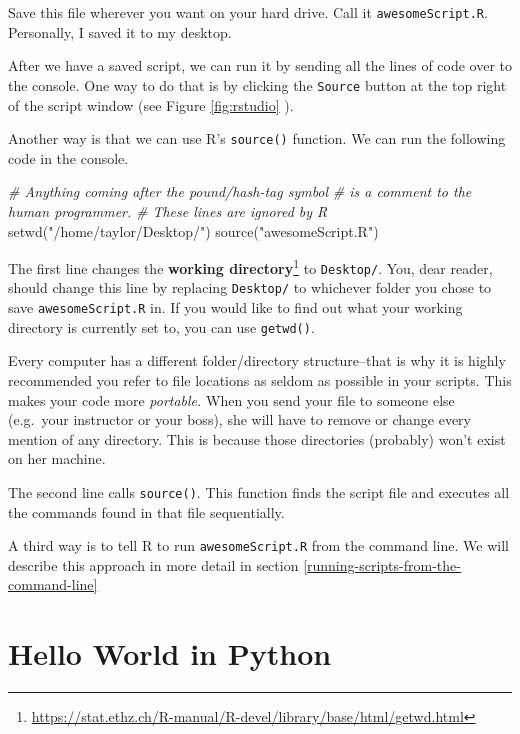 \documentclass[
  12pt,
  krantz2]{krantz}
\makeatletter
\newenvironment{Shaded}{\begin{snugshade}}{\end{snugshade}}
\newcommand{\CommentTok}[1]{\textcolor[rgb]{0.37,0.37,0.37}{\textit{#1}}}
\newcommand{\FunctionTok}[1]{\textcolor[rgb]{0,0,0}{#1}}
\newcommand{\NormalTok}[1]{#1}
\newcommand{\StringTok}[1]{\textcolor[rgb]{0.5,0.5,0.5}{#1}}
\renewcommand{\href}[2]{#2\footnote{\url{#1}}}
\newenvironment{kframe}{%
\medskip{}
\setlength{\fboxsep}{.8em}
 \def\at@end@of@kframe{}%
 \ifinner\ifhmode%
  \def\at@end@of@kframe{\end{minipage}}%
  \begin{minipage}{\columnwidth}%
 \fi\fi%
 \def\FrameCommand##1{\hskip\@totalleftmargin \hskip-\fboxsep
 \colorbox{shadecolor}{##1}\hskip-\fboxsep
     \hskip-\linewidth \hskip-\@totalleftmargin \hskip\columnwidth}%
 \MakeFramed {\advance\hsize-\width
   \@totalleftmargin\z@ \linewidth\hsize
   \@setminipage}}%
 {\par\unskip\endMakeFramed%
 \at@end@of@kframe}
\renewenvironment{Shaded}{\begin{kframe}}{\end{kframe}}
\makeatother
\begin{document}
Save this file wherever you want on your hard drive. Call it \texttt{awesomeScript.R}. Personally, I saved it to my desktop.

After we have a saved script, we can run it by sending all the lines of code over to the console. One way to do that is by clicking the \texttt{Source} button at the top right of the script window (see Figure \ref{fig:rstudio} ).

Another way is that we can use R's \texttt{source()} function. We can run the following code in the console.

\begin{Shaded}
\begin{Highlighting}[]
\CommentTok{\# Anything coming after the pound/hash{-}tag symbol }
\CommentTok{\# is a comment to the human programmer.}
\CommentTok{\# These lines are ignored by R}
\FunctionTok{setwd}\NormalTok{(}\StringTok{"/home/taylor/Desktop/"}\NormalTok{)}
\FunctionTok{source}\NormalTok{(}\StringTok{"awesomeScript.R"}\NormalTok{)}
\end{Highlighting}
\end{Shaded}

The first line changes the \href{https://stat.ethz.ch/R-manual/R-devel/library/base/html/getwd.html}{\textbf{working directory}} to \texttt{Desktop/}. You, dear reader, should change this line by replacing \texttt{Desktop/} to whichever folder you chose to save \texttt{awesomeScript.R} in. If you would like to find out what your working directory is currently set to, you can use \texttt{getwd()}.

Every computer has a different folder/directory structure--that is why it is highly recommended you refer to file locations as seldom as possible in your scripts. This makes your code more \emph{portable.} When you send your file to someone else (e.g.~your instructor or your boss), she will have to remove or change every mention of any directory. This is because those directories (probably) won't exist on her machine.

The second line calls \texttt{source()}. This function finds the script file and executes all the commands found in that file sequentially.

A third way is to tell R to run \texttt{awesomeScript.R} from the command line. We will describe this approach in more detail in section \ref{running-scripts-from-the-command-line}

\hypertarget{hello-world-in-python}{%
\section{Hello World in Python}\label{hello-world-in-python}}
\end{document}
